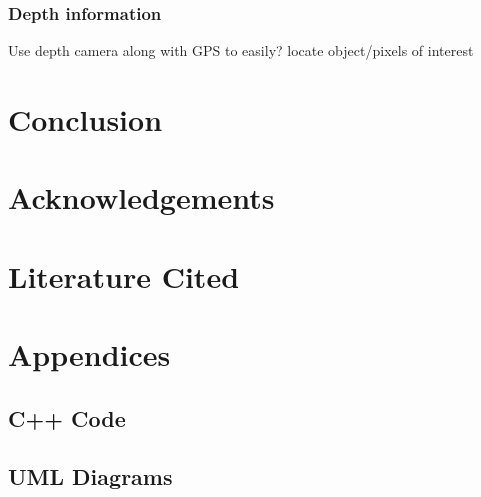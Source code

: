 \documentclass[a4paper,10pt]{article}
\begin{document}
    \subsubsection{Depth information}
    Use depth camera along with GPS to easily? locate object/pixels of interest
  
\section{Conclusion}
\section{Acknowledgements}
\section{Literature Cited}
\section{Appendices}
  \subsection{C++ Code}
  \subsection{UML Diagrams}
  
\end{document}
